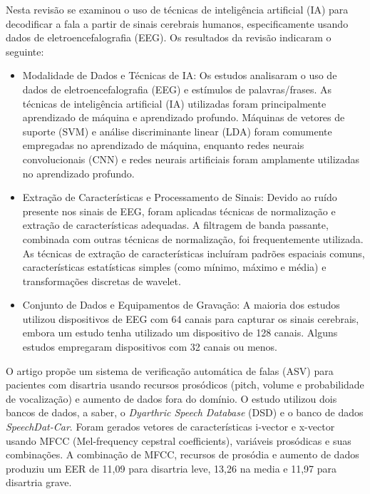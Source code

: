 \documentclass[a4paper,12pt,openright,oneside]{book}
\newenvironment{myenv}[1]
  {\begin{spacing}{#1}}
  {\end{spacing}}
\begin{document}
\begin{myenv}{1.5}
				\par Nesta revisão \cite{WOS:000857544900001} se examinou o uso de técnicas de inteligência artificial (IA) para decodificar a fala a partir de sinais cerebrais humanos, especificamente usando dados de eletroencefalografia (EEG). Os resultados da revisão indicaram o seguinte:
				
				\begin{itemize}
					\item Modalidade de Dados e Técnicas de IA: Os estudos analisaram o uso de dados de eletroencefalografia (EEG) e estímulos de palavras/frases. As técnicas de inteligência artificial (IA) utilizadas foram principalmente aprendizado de máquina e aprendizado profundo. Máquinas de vetores de suporte (SVM) e análise discriminante linear (LDA) foram comumente empregadas no aprendizado de máquina, enquanto redes neurais convolucionais (CNN) e redes neurais artificiais foram amplamente utilizadas no aprendizado profundo.
					
					\item Extração de Características e Processamento de Sinais: Devido ao ruído presente nos sinais de EEG, foram aplicadas técnicas de normalização e extração de características adequadas. A filtragem de banda passante, combinada com outras técnicas de normalização, foi frequentemente utilizada. As técnicas de extração de características incluíram padrões espaciais comuns, características estatísticas simples (como mínimo, máximo e média) e transformações discretas de wavelet.
					
					\item Conjunto de Dados e Equipamentos de Gravação: A maioria dos estudos utilizou dispositivos de EEG com 64 canais para capturar os sinais cerebrais, embora um estudo tenha utilizado um dispositivo de 128 canais. Alguns estudos empregaram dispositivos com 32 canais ou menos.
				\end{itemize}
	
				\par O artigo \cite{salim2023automatic} propõe um sistema de verificação automática de falas (ASV) para pacientes com disartria usando recursos prosódicos (pitch, volume e probabilidade de vocalização) e aumento de dados fora do domínio. O estudo utilizou dois bancos de dados, a saber, o \textit{Dyarthric Speech Database} (DSD) e o banco de dados \textit{SpeechDat-Car}. Foram gerados vetores de características i-vector e x-vector usando MFCC (Mel-frequency cepstral coefficients), variáveis prosódicas e suas combinações. A combinação de MFCC, recursos de prosódia e aumento de dados produziu um EER de 11,09 para disartria leve, 13,26 na media e 11,97 para disartria grave.\newline
	

\end{myenv}
\end{document}
